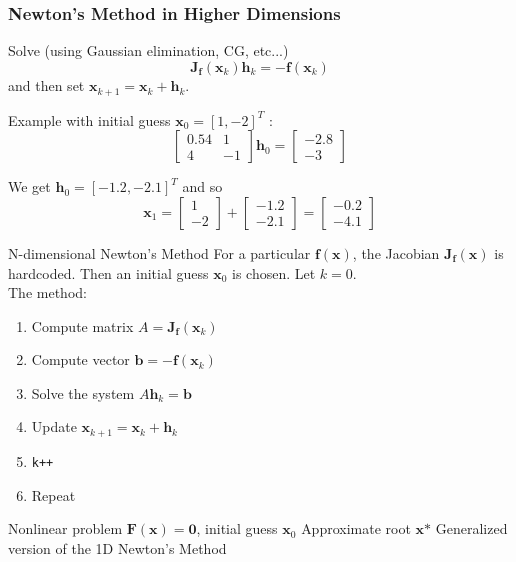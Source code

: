 \documentclass[10pt]{beamer}
\begin{document}
\begin{frame}
\frametitle{Newton's Method in Higher Dimensions}
Solve (using Gaussian elimination, CG, etc...)
\[
\mathbf{J}_{\mathbf{f}}(\mathbf{x}_k) \mathbf{h}_{k} =  -\mathbf{f}(\mathbf{x}_k)
\]
and then set $\mathbf{x}_{k+1} = \mathbf{x}_{k} + \mathbf{h}_{k} $.

\vspace{3ex}

Example with initial guess $\mathbf{x}_0 = [1,-2]^T$ :
\[
\begin{bmatrix}
0.54& 1\\
4 & -1
\end{bmatrix} \mathbf{h}_0 = \begin{bmatrix}
-2.8\\
-3
\end{bmatrix}
\]

We get $\mathbf{h}_0  = [-1.2, -2.1]^T$ and so
\[
\mathbf{x}_1 = 
\begin{bmatrix}
1\\
-2
\end{bmatrix} + 
\begin{bmatrix}
-1.2\\
-2.1
\end{bmatrix}
= \begin{bmatrix}
-0.2\\
-4.1
\end{bmatrix}
\]
\end{frame}

\begin{frame}{N-dimensional Newton's Method}
For a particular $\textbf{f}(\textbf{x})$, the Jacobian $\textbf{J}_{\textbf{f}}(\textbf{x})$ is hardcoded. Then an initial guess $\textbf{x}_0$ is chosen. Let $k=0$.\\

The method:
\begin{enumerate}
    \item Compute matrix $A = \textbf{J}_{\textbf{f}}(\textbf{x}_{k})$
    \item Compute vector $\textbf{b} =  -\mathbf{f}(\mathbf{x}_k)$
    \item Solve the system $A \textbf{h}_k = \textbf{b}$
    \item Update $\textbf{x}_{k+1} = \textbf{x}_{k} + \textbf{h}_k$
    \item \texttt{k++}
    \item Repeat
\end{enumerate}


{Nonlinear problem $\textbf{F}(\textbf{x})=\textbf{0}$, initial guess $\textbf{x}_0$}
{Approximate root $\textbf{x*}$}
{Generalized version of the 1D Newton's Method}
    
\end{frame}
\end{document}
